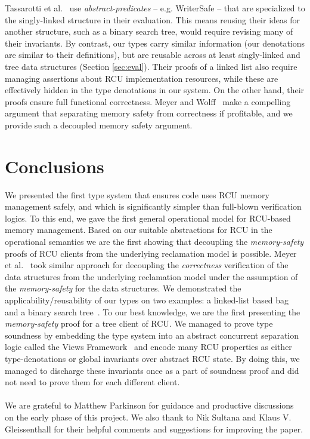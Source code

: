 Tassarotti et al.~\cite{verrcu} use \textit{abstract-predicates} -- e.g. WriterSafe -- that are specialized to the singly-linked structure in their evaluation.  This means reusing their ideas for another structure, such as a binary search tree, would require revising many of their invariants.  By contrast, our types carry similar information (our denotations are similar to their definitions), but are reusable across at least singly-linked and tree data structures (Section \ref{sec:eval}). 
Their proofs of a linked list also require managing assertions about RCU implementation resources, while these are effectively hidden in the type denotations in our system.
On the other hand, their proofs ensure full functional correctness.  Meyer and Wolff~\cite{myr} make a compelling argument that separating memory safety from correctness if profitable, and we provide such a decoupled memory safety argument. 
\section{Conclusions}
\label{sec:concls}
We presented the first type system that ensures code uses RCU memory management safely, and which is significantly simpler than full-blown verification logics. To this end, we gave the first general operational model for RCU-based memory management. Based on our suitable abstractions for RCU in the operational semantics we are the first showing that decoupling the \textit{memory-safety} proofs of RCU clients from the underlying reclamation model is possible. Meyer et al.~\cite{myr} took similar approach for decoupling the \textit{correctness} verification of the data structures from the underlying reclamation model under the assumption of the \textit{memory-safety} for the data structures. We demonstrated the applicability/reusability of our types on two examples: a linked-list based bag~\cite{McKenney2015SomeEO} and a binary search tree~\cite{Arbel:2014:CUR:2611462.2611471}. To our best knowledge, we are the first presenting the \textit{memory-safety} proof for a tree client of RCU. We managed to prove type soundness by embedding the type system into an abstract concurrent separation logic called the Views Framework~\cite{views} and encode many RCU properties as either type-denotations or global invariants over abstract RCU state. By doing this, we managed to discharge these invariants once as a part of soundness proof and did not need to prove them for each different client.
\paragraph{}
 We are grateful to Matthew Parkinson for guidance and productive discussions on the early phase of this project. We also thank to Nik Sultana and Klaus V. Gleissenthall for their helpful comments and suggestions for improving the paper.
